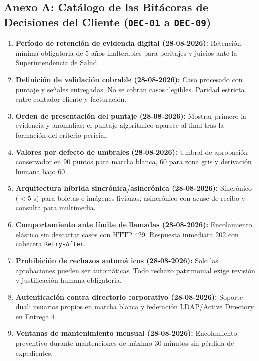 \documentclass[11pt,letterpaper]{article}
\begin{document}
\subsection{Anexo A: Catálogo de las Bitácoras de Decisiones del Cliente (\texttt{DEC-01} a \texttt{DEC-09})}
\begin{enumerate}[label=\textbf{DEC-\arabic*:},leftmargin=*]
    \item \textbf{Período de retención de evidencia digital (28-08-2026):} Retención mínima obligatoria de 5 años inalterables para peritajes y juicios ante la Superintendencia de Salud.
    \item \textbf{Definición de validación cobrable (28-08-2026):} Caso procesado con puntaje y señales entregadas. No se cobran casos ilegibles. Paridad estricta entre contador cliente y facturación.
    \item \textbf{Orden de presentación del puntaje (28-08-2026):} Mostrar primero la evidencia y anomalías; el puntaje algorítmico aparece al final tras la formación del criterio pericial.
    \item \textbf{Valores por defecto de umbrales (28-08-2026):} Umbral de aprobación conservador en 90 puntos para marcha blanca, 60 para zona gris y derivación humana bajo 60.
    \item \textbf{Arquitectura híbrida sincrónica/asincrónica (28-08-2026):} Sincrónico ($<5$ s) para boletas e imágenes livianas; asincrónico con acuse de recibo y consulta para multimedia.
    \item \textbf{Comportamiento ante límite de llamadas (28-08-2026):} Encolamiento elástico sin descartar casos con HTTP 429. Respuesta inmediata 202 con cabecera \texttt{Retry-After}.
    \item \textbf{Prohibición de rechazos automáticos (28-08-2026):} Solo las aprobaciones pueden ser automáticas. Todo rechazo patrimonial exige revisión y justificación humana obligatoria.
    \item \textbf{Autenticación contra directorio corporativo (28-08-2026):} Soporte dual: usuarios propios en marcha blanca y federación LDAP/Active Directory en Entrega 4.
    \item \textbf{Ventanas de mantenimiento mensual (28-08-2026):} Encolamiento preventivo durante mantenciones de máximo 30 minutos sin pérdida de expedientes.
\end{enumerate}
\end{document}
